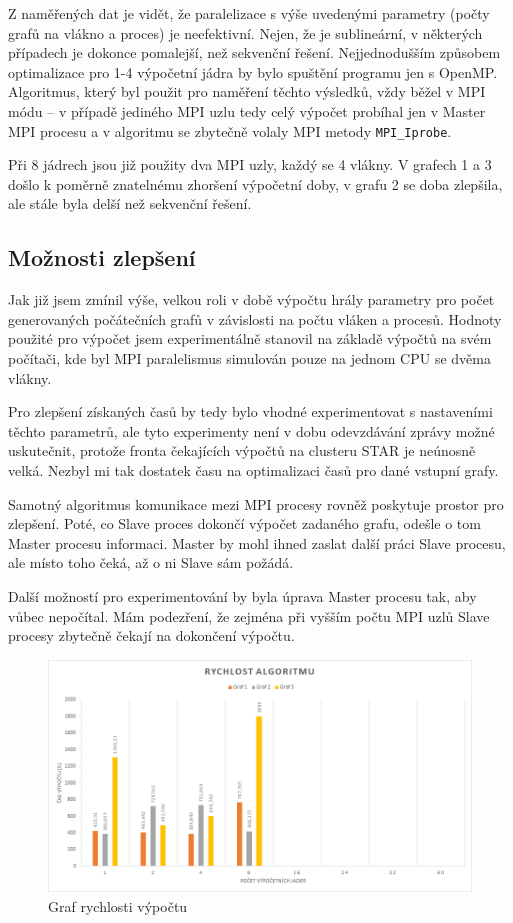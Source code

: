 \documentclass[czech]{article}
\begin{document}
Z naměřených dat je vidět, že paralelizace s výše uvedenými parametry (počty grafů na vlákno a proces) je neefektivní. Nejen, že je sublineární, v některých případech je dokonce pomalejší, než sekvenční řešení. Nejjednodušším způsobem optimalizace pro 1-4 výpočetní jádra by bylo spuštění programu jen s OpenMP. Algoritmus, který byl použit pro naměření těchto výsledků, vždy běžel v MPI módu -- v případě jediného MPI uzlu tedy celý výpočet probíhal jen v Master MPI procesu a v algoritmu se zbytečně volaly MPI metody \texttt{MPI\_Iprobe}.

Při 8 jádrech jsou již použity dva MPI uzly, každý se 4 vlákny. V grafech 1 a 3 došlo k poměrně znatelnému zhoršení výpočetní doby, v grafu 2 se doba zlepšila, ale stále byla delší než sekvenční řešení.

\subsection{Možnosti zlepšení}
Jak již jsem zmínil výše, velkou roli v době výpočtu hrály parametry pro počet generovaných počátečních grafů v závislosti na počtu vláken a procesů. Hodnoty použité pro výpočet jsem experimentálně stanovil na základě výpočtů na svém počítači, kde byl MPI paralelismus simulován pouze na jednom CPU se dvěma vlákny. 

Pro zlepšení získaných časů by tedy bylo vhodné experimentovat s nastaveními těchto parametrů, ale tyto experimenty není v dobu odevzdávání zprávy možné uskutečnit, protože fronta čekajících výpočtů na clusteru STAR je neúnosně velká. Nezbyl mi tak dostatek času na optimalizaci časů pro dané vstupní grafy.

Samotný algoritmus komunikace mezi MPI procesy rovněž poskytuje prostor pro zlepšení. Poté, co Slave proces dokončí výpočet zadaného grafu, odešle o tom Master procesu informaci. Master by mohl ihned zaslat další práci Slave procesu, ale místo toho čeká, až o ni Slave sám požádá.

Další možností pro experimentování by byla úprava Master procesu tak, aby vůbec nepočítal. Mám podezření, že zejména při vyšším počtu MPI uzlů Slave procesy zbytečně čekají na dokončení výpočtu.

\begin{figure} 
	\centering
	\caption{Graf rychlosti výpočtu}
	\label{times-graph}
	\includegraphics[width=\textwidth]{graph/times-chart.png}
\end{figure}
\end{document}
